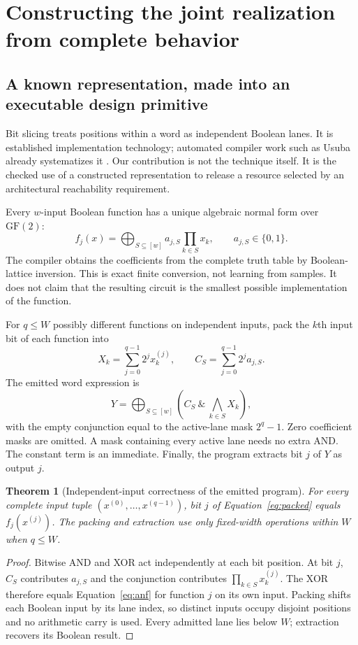 \documentclass[11pt,letterpaper]{article}
\newtheorem{theorem}{Theorem}[section]
\theoremstyle{definition}\newtheorem{definition}[theorem]{Definition}
\theoremstyle{remark}\newtheorem{remark}[theorem]{Remark}
\newcommand{\Xor}{\mathop{\bigoplus}}
\begin{document}
\section{Constructing the joint realization from complete behavior}
\label{sec:compiler}
\subsection{A known representation, made into an executable design primitive}
Bit slicing treats positions within a word as independent Boolean lanes. It is established implementation technology; automated compiler work such as Usuba already systematizes it \citep{biham,usuba}. Our contribution is not the technique itself. It is the checked use of a constructed representation to release a resource selected by an architectural reachability requirement.

Every $w$-input Boolean function has a unique algebraic normal form over $\mathrm{GF}(2)$:
\begin{equation}
 f_j(x)=\Xor_{S\subseteq[w]} a_{j,S}\prod_{k\in S}x_k,
 \qquad a_{j,S}\in\{0,1\}.
 \label{eq:anf}
\end{equation}
The compiler obtains the coefficients from the complete truth table by Boolean-lattice inversion. This is exact finite conversion, not learning from samples. It does not claim that the resulting circuit is the smallest possible implementation of the function.

For $q\le W$ possibly different functions on independent inputs, pack the $k$th input bit of each function into
\begin{equation}
 X_k=\sum_{j=0}^{q-1}2^j x^{(j)}_k,\qquad
 C_S=\sum_{j=0}^{q-1}2^j a_{j,S}.
 \label{eq:packing}
\end{equation}
The emitted word expression is
\begin{equation}
 Y=\Xor_{S\subseteq[w]}\left(C_S\ \mathbin{\&}\ \mathop{\bigwedge}_{k\in S}X_k\right),
 \label{eq:packed}
\end{equation}
with the empty conjunction equal to the active-lane mask $2^q-1$. Zero coefficient masks are omitted. A mask containing every active lane needs no extra AND. The constant term is an immediate. Finally, the program extracts bit $j$ of $Y$ as output $j$.

\begin{theorem}[Independent-input correctness of the emitted program]
\label{thm:packing}
For every complete input tuple $(x^{(0)},\ldots,x^{(q-1)})$, bit $j$ of Equation~\eqref{eq:packed} equals $f_j(x^{(j)})$. The packing and extraction use only fixed-width operations within $W$ when $q\le W$.
\end{theorem}
\begin{proof}
Bitwise AND and XOR act independently at each bit position. At bit $j$, $C_S$ contributes $a_{j,S}$ and the conjunction contributes $\prod_{k\in S}x^{(j)}_k$. The XOR therefore equals Equation~\eqref{eq:anf} for function $j$ on its own input. Packing shifts each Boolean input by its lane index, so distinct inputs occupy disjoint positions and no arithmetic carry is used. Every admitted lane lies below $W$; extraction recovers its Boolean result.
\end{proof}
\end{document}
